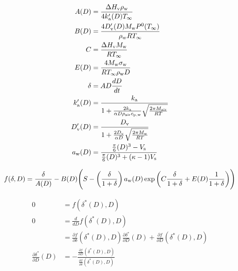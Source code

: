 \documentclass{article}
\begin{document}
\begin{align}
A(D) &= \frac{\Delta H_{\rm v} \rho_{\rm w}}{4 k_{\rm a}'(D) T_{\infty}} \\
B(D) &= \frac{4 D_{\rm v}'(D) M_{\rm w} P^{\rm 0}(T_{\infty})}{\rho_w R T_{\infty}} \\
C &= \frac{\Delta H_{\rm v} M_{\rm w}}{R T_{\infty}} \\
E(D) &= \frac{4 M_{\rm w}\sigma_{\rm w}}{R T_{\infty} \rho_{\rm w} D} \\
\delta &= A D \frac{d D}{dt} \\
k_{\rm a}'(D) &= \frac{k_{\rm a}}{1 + \frac{2 k_{\rm a}}{\alpha D \rho_{\rm air} c_{\rm p,w}} \sqrt{\frac{2 \pi M_{\rm air}}{R T}}} \\
D_{\rm v}'(D) &= \frac{D_{\rm v}}{1 + \frac{2 D_{\rm v}}{\alpha D} \sqrt{\frac{2 \pi M_{\rm w}}{R T}}} \\
a_{\rm w}(D) &= \frac{\frac{\pi}{6}(D)^{3}-V_{\rm s}}{\frac{\pi}{6}(D)^{3}+(\kappa-1)V_{\rm s}}
\end{align}

\begin{equation}
  f(\delta, D) = \frac{\delta}{A(D)}
  - B(D) \Bigg(S-\left(\frac{\delta}{1+\delta}\right)
  a_{\rm w}(D)
  \exp{\left(C \frac{\delta}{1+\delta} + E(D) \frac{1}{1+\delta}\right)} \Bigg)
\end{equation}

\begin{align}
  0 &= f(\delta^*(D), D) \\
  0 &= \frac{d}{d D} f(\delta^*(D), D) \\
  &= \frac{\partial f}{\partial \delta}(\delta^*(D), D)
  \frac{\partial \delta^*}{\partial D}(D)
  + \frac{\partial f}{\partial D}(\delta^*(D), D) \\
  \frac{\partial \delta^*}{\partial D}(D)
  &= - \frac{\frac{\partial f}{\partial D}(\delta^*(D), D)}{\frac{\partial f}{\partial \delta}(\delta^*(D), D)}
\end{align}
\end{document}
